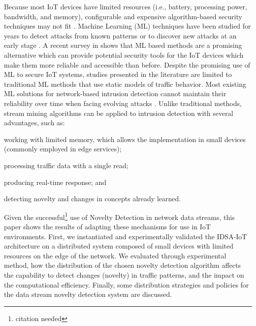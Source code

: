 Because most IoT devices have limited resources (i.e., battery, processing
power, bandwidth, and memory), configurable and expensive algorithm-based
security techniques may not fit %
\cite{Zhou2017}.
Machine Learning (ML) techniques have been studied for years to detect attacks
from known patterns or to discover new attacks at an early stage
\cite{buczak2016survey,mitchell2014survey}.
A recent survey in \cite{Tahsien2020} shows that ML based methods are a
promising alternative which can provide potential security tools for the IoT
devices which make them more reliable and accessible than before.
Despite the promising use of ML to secure IoT systems, %
studies presented in the literature %
\cite{buczak2016survey,mitchell2014survey,Tahsien2020} %
are limited to
traditional ML methods that use static models of traffic behavior.
Most existing ML solutions for network-based intrusion detection cannot maintain
their reliability over time when facing evolving attacks \cite{Viegas2019}.
Unlike traditional methods, stream mining algorithms can be applied to intrusion
detection with several advantages, such as:
\begin{enumerate*}[label=(\emph{\roman*})]
    \item working with limited memory, which allows the implementation in small
    devices (commonly employed in edge services);
    \item processing traffic data with a single read;
    \item producing real-time response; and
    \item detecting novelty and changes in concepts already learned.
\end{enumerate*}

Given the successful\footnote{\color{red}citation needed}
use of Novelty Detection in network data streams,
this paper shows the results of adapting these mechanisms for use in IoT environments.
First, we instantiated and experimentally validated the IDSA-IoT
architecture \cite{Cassales2019a} on a distributed system
composed of small devices with limited resources on the edge of the network.
We evaluated through experimental method, how the distribution of
the chosen novelty detection algorithm
affects the capability to detect changes (novelty) in
traffic patterns, and the impact on the computational efficiency.
Finally, some distribution strategies and policies for the data stream
novelty detection system are discussed.

